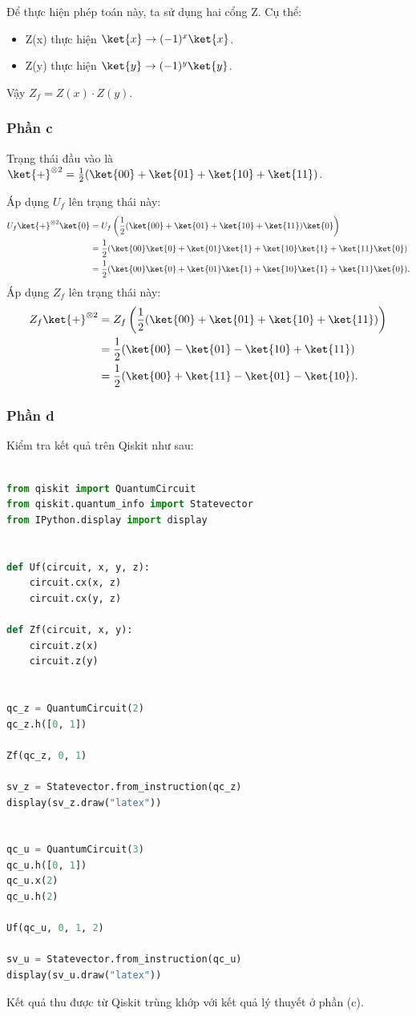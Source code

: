 Để thực hiện phép toán này, ta sử dụng hai cổng Z. Cụ thể:
\begin{itemize}
    \item Z(x) thực hiện $\ket{x} \rightarrow (-1)^x \ket{x}$.
    \item Z(y) thực hiện $\ket{y} \rightarrow (-1)^y \ket{y}$.
\end{itemize}

Vậy $Z_f = Z(x) \cdot Z(y)$.

\subsubsection{Phần c}
Trạng thái đầu vào là $\ket{+}^{\otimes 2} = \frac{1}{2}(\ket{00} + \ket{01} + \ket{10} + \ket{11})$.

Áp dụng $U_f$ lên trạng thái này:
\begin{align*}
U_f \ket{+}^{\otimes 2} \ket{0} &= U_f \left( \frac{1}{2}(\ket{00} + \ket{01} + \ket{10} + \ket{11}) \ket{0} \right) \\
&= \frac{1}{2}(\ket{00}\ket{0} + \ket{01}\ket{1} + \ket{10}\ket{1} + \ket{11}\ket{0}) \\
&= \frac{1}{2}(\ket{00}\ket{0} + \ket{01}\ket{1} + \ket{10}\ket{1} + \ket{11}\ket{0}).
\end{align*}
Áp dụng $Z_f$ lên trạng thái này:
\begin{align*}
Z_f \ket{+}^{\otimes 2} &= Z_f \left( \frac{1}{2}(\ket{00} + \ket{01} + \ket{10} + \ket{11}) \right) \\
&= \frac{1}{2}(\ket{00} - \ket{01} - \ket{10} + \ket{11}) \\
&= \frac{1}{2}(\ket{00} + \ket{11} - \ket{01} - \ket{10}).
\end{align*}

\subsubsection{Phần d}

Kiểm tra kết quả trên Qiskit như sau:
\begin{lstlisting}[language=Python]
    
from qiskit import QuantumCircuit
from qiskit.quantum_info import Statevector
from IPython.display import display


def Uf(circuit, x, y, z):
    circuit.cx(x, z)
    circuit.cx(y, z)

def Zf(circuit, x, y):
    circuit.z(x)
    circuit.z(y)


qc_z = QuantumCircuit(2)
qc_z.h([0, 1])

Zf(qc_z, 0, 1)

sv_z = Statevector.from_instruction(qc_z)
display(sv_z.draw("latex"))


qc_u = QuantumCircuit(3)
qc_u.h([0, 1])
qc_u.x(2)
qc_u.h(2)

Uf(qc_u, 0, 1, 2)

sv_u = Statevector.from_instruction(qc_u)
display(sv_u.draw("latex"))
\end{lstlisting}


Kết quả thu được từ Qiskit trùng khớp với kết quả lý thuyết ở phần (c).